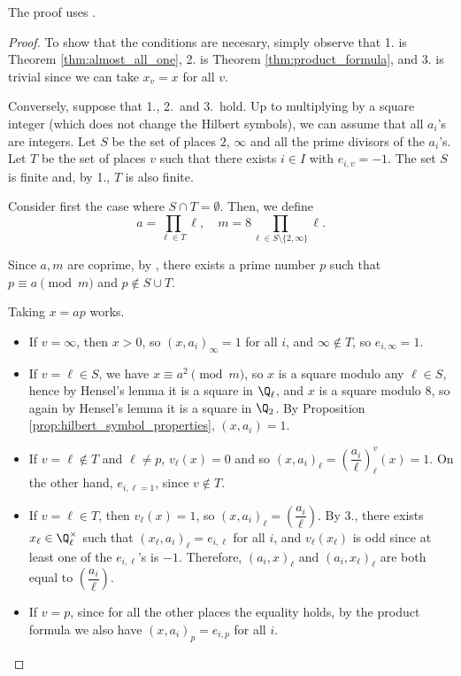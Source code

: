The proof uses .

\begin{proof}
To show that the conditions are necesary, simply observe that 1. is Theorem \ref{thm:almost_all_one},
2. is Theorem \ref{thm:product_formula}, and 3. is trivial since we can take $x_v = x$ for all $v$.

Conversely, suppose that 1., 2.\ and 3.\ hold. Up to multiplying by a square integer (which does
not change the Hilbert symbols), we can assume that all $a_i$'s are integers.
Let $S$ be the set of places $2$, $\infty$ and all the prime divisors of the $a_i$'s.
Let $T$ be the set of places $v$ such that there exists $i \in I$ with $e_{i,v}=-1$.
The set $S$ is finite and, by 1., $T$ is also finite.

Consider first the case where $S \cap T= \emptyset$. Then, we define
\[
a = \prod_{\ell \in T} \ell, \quad m = 8 \prod_{\ell \in S \setminus\{2,\infty\}} \ell.
\]

Since $a,m$ are coprime, by , there exists a prime number
$p$ such that $p \equiv a \pmod m$ and $p \not\in S \cup T$.

Taking $x=ap$ works.
\begin{itemize}
	\item If $v= \infty$, then $x > 0$, so $(x, a_i)_\infty = 1$ for all $i$, and $\infty \notin T$,
	so $e_{i,\infty}=1$.
	\item If $v = \ell \in S$, we have $x \equiv a^2 \pmod m$, so $x$ is a square modulo any $\ell \in S$,
	hence by Hensel's lemma it is a square in $\Q_\ell$, and $x$ is a square modulo $8$, so again by
	Hensel's lemma it is a square in $\Q_2$. By Proposition \ref{prop:hilbert_symbol_properties},
	$(x,a_i)=1$.
	\item If $v = \ell \notin T$ and $\ell \ne p$, $v_\ell(x)=0$ and so
	$(x,a_i)_{\ell}=\left(\dfrac{a_i}{\ell}\right)^v_{\ell}(x)=1$. On the other hand, $e_{i,\ell=1}$,
	since $v \notin T$.
	\item If $v = \ell \in T$, then $v_\ell(x)=1$, so $(x,a_i)_{\ell}=\left(\dfrac{a_i}{\ell}\right)$.
  By 3., there exists $x_\ell \in \Q_\ell^\times$ such that $(x_\ell, a_i)_\ell = e_{i,\ell}$ for all $i$,
	and $v_\ell(x_\ell)$ is odd since at least one of the $e_{i,\ell}$'s is $-1$.
	Therefore, $(a_i,x)_\ell$ and $(a_i,x_\ell)_\ell$ are both equal to $\left(\dfrac{a_i}{\ell}\right)$.
	\item If $v = p$, since for all the other places the equality holds, by the product formula we
	also have $(x,a_i)_p = e_{i,p}$ for all $i$.
\end{itemize}


\end{proof}
